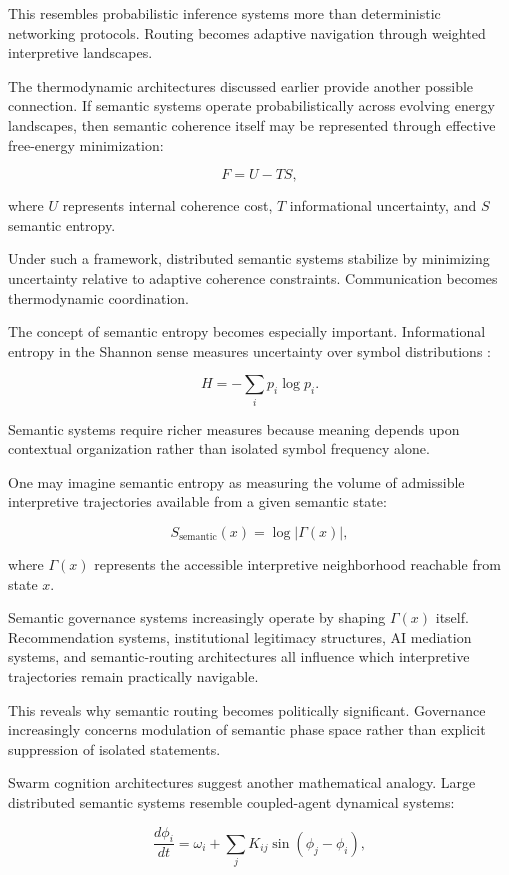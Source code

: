 \documentclass[11pt,a4paper]{article}
\begin{document}
This resembles probabilistic inference systems more than deterministic networking protocols. Routing becomes adaptive navigation through weighted interpretive landscapes.

The thermodynamic architectures discussed earlier provide another possible connection. If semantic systems operate probabilistically across evolving energy landscapes, then semantic coherence itself may be represented through effective free-energy minimization:

\[
F = U - TS,
\]

where $U$ represents internal coherence cost, $T$ informational uncertainty, and $S$ semantic entropy.

Under such a framework, distributed semantic systems stabilize by minimizing uncertainty relative to adaptive coherence constraints. Communication becomes thermodynamic coordination.

The concept of semantic entropy becomes especially important. Informational entropy in the Shannon sense measures uncertainty over symbol distributions \cite{shannon1948}:

\[
H = -\sum_i p_i \log p_i.
\]

Semantic systems require richer measures because meaning depends upon contextual organization rather than isolated symbol frequency alone.

One may imagine semantic entropy as measuring the volume of admissible interpretive trajectories available from a given semantic state:

\[
S_{\text{semantic}}(x) = \log |\Gamma(x)|,
\]

where $\Gamma(x)$ represents the accessible interpretive neighborhood reachable from state $x$.

Semantic governance systems increasingly operate by shaping $\Gamma(x)$ itself. Recommendation systems, institutional legitimacy structures, AI mediation systems, and semantic-routing architectures all influence which interpretive trajectories remain practically navigable.

This reveals why semantic routing becomes politically significant. Governance increasingly concerns modulation of semantic phase space rather than explicit suppression of isolated statements.

Swarm cognition architectures suggest another mathematical analogy. Large distributed semantic systems resemble coupled-agent dynamical systems:

\[
\frac{d\phi_i}{dt} = \omega_i + \sum_j K_{ij}\sin(\phi_j - \phi_i),
\]
\end{document}
